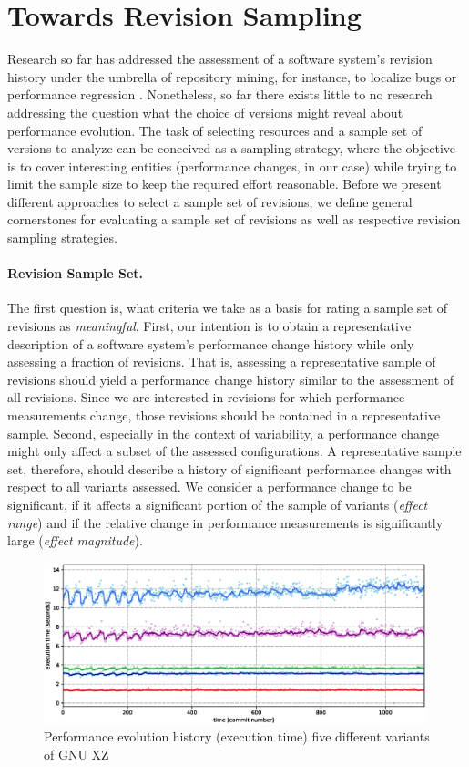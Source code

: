 \section{Towards Revision Sampling}\label{sec:towards_revsampling}
Research so far has addressed the assessment of a software system’s revision
history under the umbrella of repository mining, for instance, to localize bugs
\citep{moin_bug_2010} or performance regression \citep{heger_automated_2013}.
Nonetheless, so far there exists little to no research addressing the question
what the choice of versions might reveal about performance evolution. The task
of selecting resources and a sample set of versions to analyze can be conceived
as a sampling strategy, where the objective is to cover interesting entities
(performance changes, in our case) while trying to limit the sample size to
keep the required effort reasonable. Before we present different approaches to
select a sample set of revisions, we define general cornerstones for
evaluating a sample set of revisions as well as respective revision sampling
strategies.

\paragraph{Revision Sample Set.} The first question is, what criteria we take as
a basis for rating a sample set of revisions as \emph{meaningful}. First, our intention
is to obtain a representative description of a software system’s performance
change history while only assessing a fraction of revisions. That is, assessing
a representative sample of revisions should yield a performance change history
similar to the assessment of all revisions. Since we are interested in
revisions for which performance measurements change, those revisions should be
contained in a representative sample. Second, especially in the context of
variability, a performance change might only affect a subset of the assessed
configurations. A representative sample set, therefore, should describe a
history of significant performance changes with respect to all variants
assessed. We consider a performance change to be significant, if it affects a
significant portion of the sample of variants (\emph{effect range}) and if the
relative change in performance measurements is significantly large (\emph{effect
magnitude}).

\begin{figure}[h!]
	\centering
	\includegraphics[width=0.99\textwidth]{images/xz_sample_evolution.eps}
	\caption{Performance evolution history (execution time) five
	different variants of GNU XZ}
	\label{fig:xz_evosample}
\end{figure}

